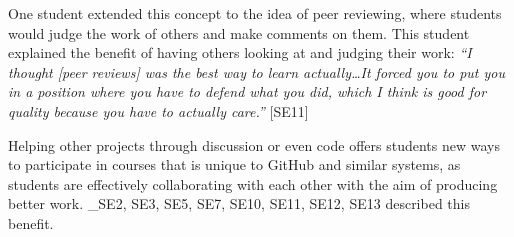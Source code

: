 One student extended this concept to the idea of peer reviewing, where students would judge the work of others and make comments on them. This student explained the benefit of having others looking at and judging their work: \textit{``I thought [peer reviews] was the best way to learn actually\ldots It forced you to put you in a position where you have to defend what you did, which I think is good for quality because you have to actually care.''} [SE11]

Helping other projects through discussion or even code offers students new ways to participate in courses that is unique to GitHub and similar systems, as students are effectively collaborating with each other with the aim of producing better work. _{SE2, SE3, SE5, SE7, SE10, SE11, SE12, SE13} described this benefit.




